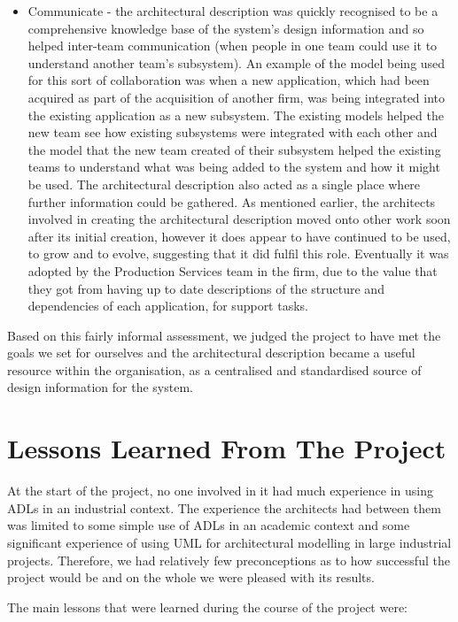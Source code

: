 \begin{itemize}
\item Communicate - the architectural description was quickly recognised to be a comprehensive knowledge base of the system's design information and so helped inter-team communication (when people in one team could use it to understand another team's subsystem).  An example of the model being used for this sort of collaboration was when a new application, which had been acquired as part of the acquisition of another firm, was being integrated into the existing application as a new subsystem.  The existing models helped the new team see how existing subsystems were integrated with each other and the model that the new team created of their subsystem helped the existing teams to understand what was being added to the system and how it might be used.  The architectural description also acted as a single place where further information could be gathered.  As mentioned earlier, the architects involved in creating the architectural description moved onto other work soon after its initial creation, however it does appear to have continued to be used, to grow and to evolve, suggesting that it did fulfil this role.  Eventually it was adopted by the Production Services team in the firm, due to the value that they got from having up to date descriptions of the structure and dependencies of each application, for support tasks.

\end{itemize}

  Based on this fairly informal assessment, we judged the project to have met the goals we set for ourselves and the architectural description became a useful resource within the organisation, as a centralised and standardised source of design information for the system.

\section{Lessons Learned From The Project}

  At the start of the project, no one involved in it had much experience in using ADLs in an industrial context.  The experience the architects had between them was limited to some simple use of ADLs in an academic context and some significant experience of using UML for architectural modelling in large industrial projects.  Therefore, we had relatively few preconceptions as to how successful the project would be and on the whole we were pleased with its results.

  The main lessons that were learned during the course of the project were:
  
